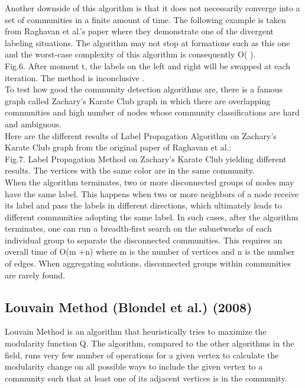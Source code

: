 \documentclass[10pt]{article}
\begin{document}
Another downside of this algorithm is that it does not necessarily converge into a set of communities in a finite amount of time. The following example is taken from Raghavan et al.’s paper where they demonstrate one of the divergent labeling situations. The algorithm may not stop at formations such as this one and the worst-case complexity of this algorithm is consequently O( ). \\

 Fig.6. After moment t, the labels on the left and right will be swapped at each iteration. The method is inconclusive \cite{raghavan}. \\

To test how good the community detection algorithms are, there is a famous graph called Zachary’s Karate Club graph in which there are overlapping communities and high number of nodes whose community classifications are hard and ambiguous. \\

Here are the different results of Label Propagation Algorithm on Zachary’s Karate Club graph from the original paper of Raghavan et al.: \\

  Fig.7. Label Propagation Method on Zachary’s Karate Club yielding different results. The vertices with the same color are in the same community\cite{raghavan}. \\

When the algorithm terminates, two or more disconnected groups of nodes may have the same label. This happens when two or more neighbors of a node receive its label and pass the labels in different directions, which ultimately leads to different communities adopting the same label. In such cases, after the algorithm terminates, one can run a breadth-first search on the subnetworks of each individual group to separate the disconnected communities. This requires an overall time of O(m +n) where m is the number of vertices and n is the number of edges. When aggregating solutions, disconnected groups within communities are rarely found. \\

\subsection{Louvain Method (Blondel et al.) (2008)}

Louvain Method is an algorithm that heuristically tries to maximize the modularity function Q. The algorithm, compared to the other algorithms in the field, runs very few number of operations for a given vertex to calculate the modularity change on all possible ways to include the given vertex to a community such that at least one of its adjacent vertices is in the community. \\
\end{document}
